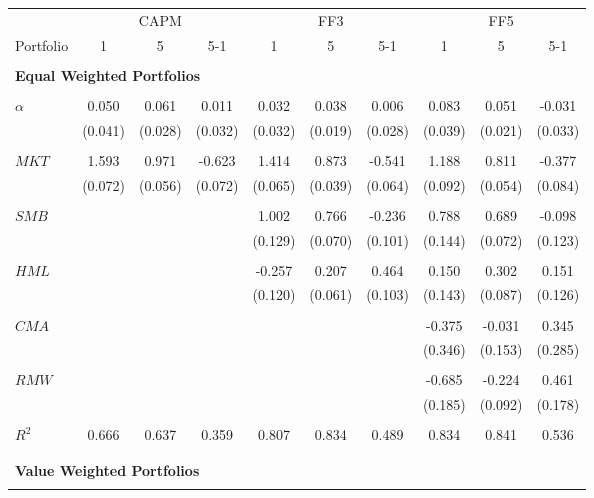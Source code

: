 \small\begin{tabular}{lccccccccc}
\toprule 
  & \multicolumn{3}{c}{CAPM} & \multicolumn{3}{c}{FF3} & \multicolumn{3}{c}{FF5} \\ 
\cline{2-10} 
 Portfolio & 1 & 5 & 5-1 & 1 & 5 & 5-1 & 1 & 5 & 5-1 \\ 
\hline \\[-1.8ex] 
\multicolumn{7}{l}{\textbf{Equal Weighted Portfolios}} \\ 
\hline \\[-1.8ex] 
$\alpha$ & 0.050  & 0.061 & 0.011 & 0.032  & 0.038 & 0.006 & 0.083  & 0.051 & -0.031 \\ 
 & (0.041) & (0.028) & (0.032) & (0.032) & (0.019) & (0.028) & (0.039) & (0.021) & (0.033) \\ \\[-1.8ex] 
$MKT$ & 1.593   & 0.971   & -0.623 & 1.414  & 0.873 & -0.541 & 1.188  & 0.811 & -0.377 \\ 
               & (0.072) & (0.056) & (0.072) & (0.065) & (0.039) & (0.064) & (0.092) & (0.054) & (0.084) \\ \\[-1.8ex] 
$SMB$ &   &  &  & 1.002  & 0.766 & -0.236 & 0.788  & 0.689 & -0.098  \\ 
 &   &   &  &  (0.129) & (0.070) & (0.101) & (0.144) & (0.072) & (0.123) \\ \\[-1.8ex] $HML$ &   &  &  & -0.257  & 0.207 & 0.464 & 0.150  & 0.302 & 0.151 \\ 
       &    &   &  &  (0.120) & (0.061) & (0.103) & (0.143) & (0.087) & (0.126) \\ \\[-1.8ex] 
$CMA$ &   &  &  & & & & -0.375  & -0.031 & 0.345  \\ 
      &   &  &  & & & & (0.346) & (0.153) & (0.285) \\ \\[-1.8ex]
 $RMW$ &   &  &  & & & & -0.685  & -0.224 & 0.461  \\ 
      &   &  &  & & & & (0.185) & (0.092) & (0.178) \\ \\[-1.8ex] 
$R^2$ & 0.666  & 0.637 & 0.359 & 0.807  & 0.834 & 0.489 & 0.834  & 0.841 & 0.536 \\ \\[-1.8ex] 
\hline \\[-1.8ex] 
\multicolumn{7}{l}{\textbf{Value Weighted Portfolios}} \\ 
\hline \\[-1.8ex] 

\end{tabular}
